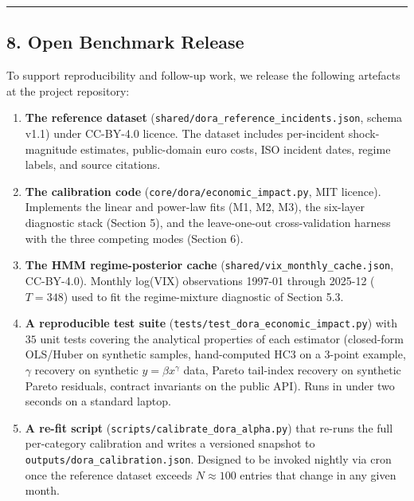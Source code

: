 \documentclass[
]{article}
\begin{document}
\begin{center}\rule{0.5\linewidth}{0.5pt}\end{center}

\subsection{8. Open Benchmark Release}\label{open-benchmark-release}

To support reproducibility and follow-up work, we release the following
artefacts at the project repository:

\begin{enumerate}
\def\labelenumi{\arabic{enumi}.}
\item
  \textbf{The reference dataset}
  (\texttt{shared/dora\_reference\_incidents.json}, schema v1.1) under
  CC-BY-4.0 licence. The dataset includes per-incident shock-magnitude
  estimates, public-domain euro costs, ISO incident dates, regime
  labels, and source citations.
\item
  \textbf{The calibration code} (\texttt{core/dora/economic\_impact.py},
  MIT licence). Implements the linear and power-law fits (M1, M2, M3),
  the six-layer diagnostic stack (Section 5), and the leave-one-out
  cross-validation harness with the three competing modes (Section 6).
\item
  \textbf{The HMM regime-posterior cache}
  (\texttt{shared/vix\_monthly\_cache.json}, CC-BY-4.0). Monthly
  log(VIX) observations 1997-01 through 2025-12 (\(T = 348\)) used to
  fit the regime-mixture diagnostic of Section 5.3.
\item
  \textbf{A reproducible test suite}
  (\texttt{tests/test\_dora\_economic\_impact.py}) with \(35\) unit
  tests covering the analytical properties of each estimator
  (closed-form OLS/Huber on synthetic samples, hand-computed HC3 on a
  3-point example, \(\gamma\) recovery on synthetic
  \(y = \beta x^\gamma\) data, Pareto tail-index recovery on synthetic
  Pareto residuals, contract invariants on the public API). Runs in
  under two seconds on a standard laptop.
\item
  \textbf{A re-fit script} (\texttt{scripts/calibrate\_dora\_alpha.py})
  that re-runs the full per-category calibration and writes a versioned
  snapshot to \texttt{outputs/dora\_calibration.json}. Designed to be
  invoked nightly via cron once the reference dataset exceeds
  \(N \approx 100\) entries that change in any given month.
\end{enumerate}
\end{document}
